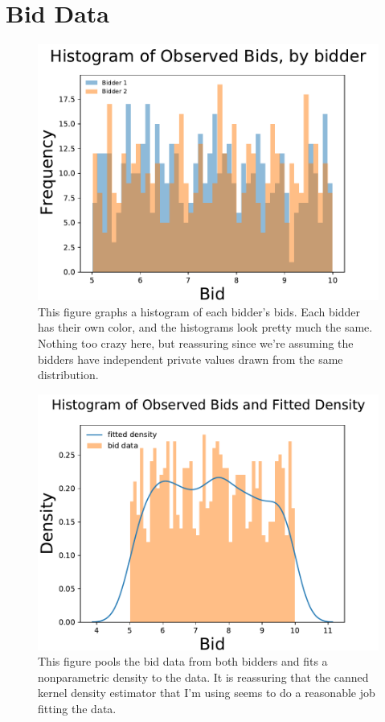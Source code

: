 \documentclass[dvipsnames]{article}
\begin{document}
  \section{Bid Data}
  \begin{figure}[htp]
    \centering
    \includegraphics{bidder_histogram.pdf}
    \caption{This figure graphs a histogram of each bidder's bids. Each bidder has their own color, and the histograms look pretty much the same. Nothing too crazy here, but reassuring since we're assuming the bidders have independent private values drawn from the same distribution.}
  \end{figure}

  
  \begin{figure}[htp]
    \centering
    \includegraphics{bid_density.pdf}
    \caption{This figure pools the bid data from both bidders and fits a nonparametric density to the data. It is reassuring that the canned kernel density estimator that I'm using seems to do a reasonable job fitting the data.}
  \end{figure}
\end{document}
